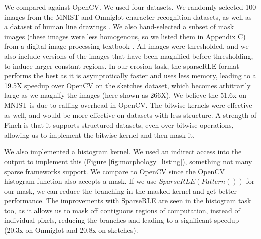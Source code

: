 We compared against OpenCV.
%
We used four datasets. We randomly selected 100 images from the MNIST \cite{lecun_gradient-based_1998} and Omniglot \cite{lake_human-level_2015} character recognition datasets, as well as a dataset of human line drawings \cite{eitz_how_2012}. 
%
We also hand-selected a subset of mask images (these images were less homogenous, so we listed them in Appendix C) from a digital image processing textbook \cite{gonzalez_digital_2006}. 
%
All images were thresholded, and we also include versions of the images that have been magnified before thresholding, to induce larger constant regions. 
%
In our erosion task, the sparseRLE format performs the best as it is asymptotically faster and uses less memory, leading to a 19.5X speedup over OpenCV on the sketches dataset, which becomes arbitrarily large as we magnify the images (here shown as 266X). 
%
We believe the 51.6x on MNIST is due to calling overhead in OpenCV. 
%
The bitwise kernels were effective as well, and would be more effective on datasets with less structure. 
%
A strength of Finch is that it supports structured datasets, even over bitwise operations, allowing us to implement the bitwise kernel and then mask it.

We also implemented a histogram kernel.
%
We used an indirect access into the output to implement this (Figure \ref{fig:morphology_listing}), something not many sparse frameworks support.
%
We compare to OpenCV since the OpenCV histogram function also accepts a mask. 
%
If we use $SparseRLE(Pattern())$ for our mask, we can reduce the branching
in the masked kernel and get better performance.
%
The improvements with SparseRLE are seen in the histogram task too, as it allows us to mask off contiguous regions of computation, instead of individual pixels, reducing the branches and leading to a significant speedup (20.3x on Omniglot and 20.8x on sketches).
%
%


